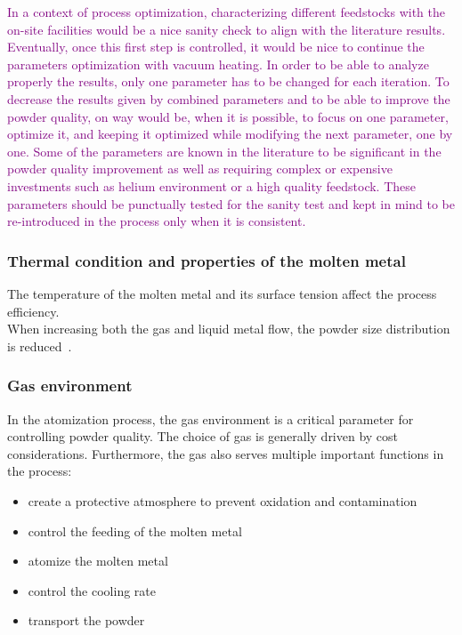 \documentclass[../main]{subfiles}
\begin{document}
\textcolor{Purple}{In a context of process optimization, characterizing different feedstocks with the on-site facilities would be a nice sanity check to align with the literature results. Eventually, once this first step is controlled, it would be nice to continue the parameters optimization with vacuum heating. In order to be able to analyze properly the results, only one parameter has to be changed for each iteration. To decrease the results given by combined parameters and to be able to improve the powder quality, on way would be, when it is possible, to focus on one parameter, optimize it, and keeping it optimized while modifying the next parameter, one by one. Some of the parameters are known in the literature to be significant in the powder quality improvement as well as requiring complex or expensive investments such as helium environment or a high quality feedstock. These parameters should be punctually tested for the sanity test and kept in mind to be re-introduced in the process only when it is consistent.}

\subsubsection{Thermal condition and properties of the molten metal}

The temperature of the molten metal and its surface tension affect the process efficiency.\\
When increasing both the gas and liquid metal flow, the powder size distribution is reduced~\cite{Kassym2020AtomizationProcesses}.


\subsubsection{Gas environment}
\label{s:gas_env}

In the atomization process, the gas environment is a critical parameter for controlling powder quality. The choice of gas is generally driven by cost considerations. Furthermore, the gas also serves multiple important functions in the process:
\begin{itemize}
    \item create a protective atmosphere to prevent oxidation and contamination
    \item control the feeding of the molten metal
    \item atomize the molten metal
    \item control the cooling rate
    \item transport the powder
\end{itemize}
\end{document}
